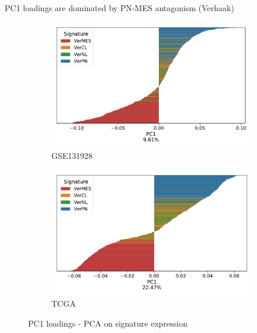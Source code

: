 \documentclass[aspectratio=169,9pt]{beamer}
\begin{document}
    \begin{frame}{PC1 loadings are dominated by PN-MES antagonism (Verhaak)}
        \begin{adjustwidth}{-5cm}{-5cm}
            \centering
            \begin{figure}\ContinuedFloat
                \centering
                \begin{subfigure}[c]{0.48\textwidth}
                    \centering
                    \includegraphics[width=\textwidth]{GSM3828672_loadingsPC1_barplot_Ver}
                    \caption{GSE131928}
                \end{subfigure}
                \begin{subfigure}[c]{0.48\textwidth}
                    \centering
                    \includegraphics[width=\textwidth]{TCGA_loadingsPC1_barplot_Ver}
                    \caption{TCGA}
                \end{subfigure}
                \caption{PC1 loadings - PCA on signature expression}
            \end{figure}
        \end{adjustwidth}
    \end{frame}
\end{document}
